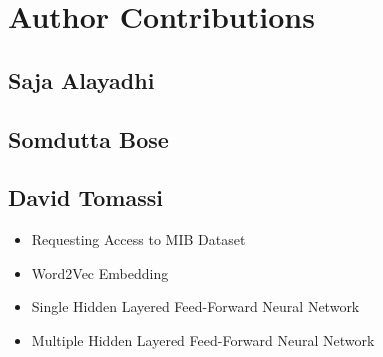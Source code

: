 \section{Author Contributions}
\label{sec:author-contributions}

\subsection{Saja Alayadhi}

\subsection{Somdutta Bose}

\subsection{David Tomassi}
\begin{itemize}
    \item Requesting Access to MIB Dataset
    \item Word2Vec Embedding
    \item Single Hidden Layered Feed-Forward Neural Network
    \item Multiple Hidden Layered Feed-Forward Neural Network
\end{itemize}
